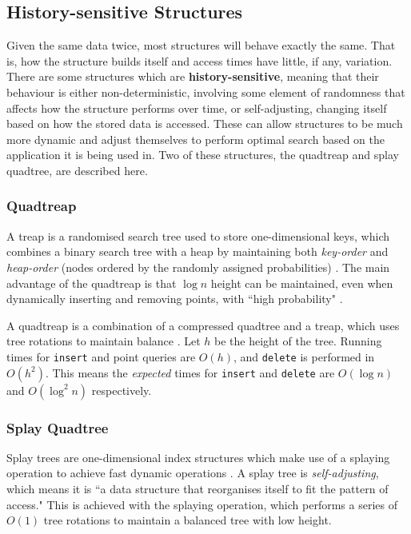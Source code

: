\subsection{History-sensitive Structures}
\label{sec:history-sensitive-structures}

Given the same data twice, most structures will behave exactly the same. That is, how the structure builds itself and access times have little, if any, variation. There are some structures which are \textbf{history-sensitive}, meaning that their behaviour is either non-deterministic, involving some element of randomness that affects how the structure performs over time, or self-adjusting, changing itself based on how the stored data is accessed. These can allow structures to be much more dynamic and adjust themselves to perform optimal search based on the application it is being used in. Two of these structures, the quadtreap and splay quadtree, are described here.

\subsubsection{Quadtreap}

A treap is a randomised search tree used to store one-dimensional keys, which combines a binary search tree with a heap by maintaining both \textit{key-order} and \textit{heap-order} (nodes ordered by the randomly assigned probabilities) \cite{quadtreap}. The main advantage of the quadtreap is that $\log n$ height can be maintained, even when dynamically inserting and removing points, with ``high probability" \cite{quadtreap}.

A quadtreap is a combination of a compressed quadtree and a treap, which uses tree rotations to maintain balance \cite{quadtreap}. Let $h$ be the height of the tree. Running times for \texttt{insert} and point queries are $O(h)$, and \texttt{delete} is performed in $O(h^2)$. This means the \textit{expected} times for \texttt{insert} and \texttt{delete} are $O(\log n)$ and $O(\log^2 n)$ respectively.

\subsubsection{Splay Quadtree}
\label{sec:splay-quadtree}

Splay trees are one-dimensional index structures which make use of a splaying operation to achieve fast dynamic operations \cite{introduction-to-algorithms}. A splay tree is \textit{self-adjusting}, which means it is ``a data structure that reorganises itself to fit the pattern of access." \cite{splay-quadtree} This is achieved with the splaying operation, which performs a series of $O(1)$ tree rotations to maintain a balanced tree with low height.

